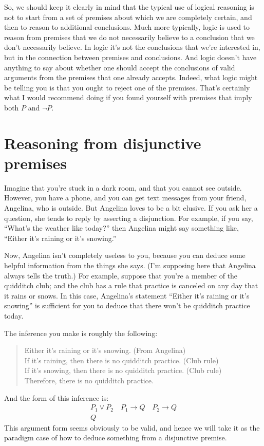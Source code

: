  So, we should keep it clearly in mind that the typical use of logical
 reasoning is not to start from a set of premises about which we are
 completely certain, and then to reason to additional conclusions.
 Much more typically, logic is used to reason from premises that we do
 not necessarily believe to a conclusion that we don't necessarily
 believe.  In logic it's not the conclusions that we're interested in,
 but in the connection between premises and conclusions.  And logic
 doesn't have anything to say about whether one should accept the
 conclusions of valid arguments from the premises that one already
 accepts.  Indeed, what logic might be telling you is that you ought
 to reject one of the premises.  That's certainly what I would
 recommend doing if you found yourself with premises that imply both
 $P$ and $\neg P$.

\section{Reasoning from disjunctive premises}

Imagine that you're stuck in a dark room, and that you cannot see
outside.  However, you have a phone, and you can get text messages
from your friend, Angelina, who is outside.  But Angelina loves to be a
bit elusive.  If you ask her a question, she tends to reply by
asserting a disjunction.  For example, if you say, ``What's the
weather like today?'' then Angelina might say something like, ``Either
it's raining or it's snowing.''

Now, Angelina isn't completely useless to you, because you can deduce
some helpful information from the things she says.  (I'm supposing
here that Angelina always tells the truth.)  For example, suppose that
you're a member of the quidditch club; and the club has a rule that
practice is canceled on any day that it rains or snows.  In this
case, Angelina's statement ``Either it's raining or it's snowing'' is
sufficient for you to deduce that there won't be quidditch practice
today.

The inference you make is roughly the following:
\begin{quote}
  Either it's raining or it's snowing. (From Angelina) \\
  If it's raining, then there is no quidditch practice. (Club rule) \\
  If it's snowing, then there is no quidditch practice. (Club rule) \\
  Therefore, there is no quidditch practice. \end{quote}
And the form of this inference is:
\[ \begin{array}{c} P_1\vee P_2 \quad P_1\to Q \quad P_2\to Q \\
     \hline Q \end{array} \] This argument form seems obviously
to be valid, and hence we will take it as the paradigm case of how to
deduce something from a disjunctive premise.

